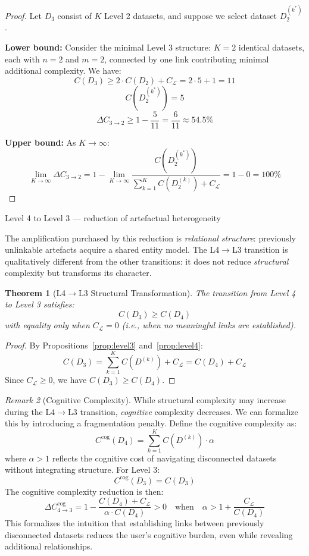 \documentclass[]{hdsr}
\makeatletter
\def\subsubsection{\@startsection{subsubsection}{3}%
  \z@{.5\linespacing\@plus.7\linespacing}{.5\linespacing}%
  {\normalfont\bfseries}}
\theoremstyle{plain}      %
\newtheorem{theorem}{Theorem}[section]
\theoremstyle{definition} %
\theoremstyle{remark}     %
\newtheorem{remark}[theorem]{Remark}
\makeatother
\begin{document}
\begin{proof}
Let $D_3$ consist of $K$ Level 2 datasets, and suppose we select dataset $D_2^{(k^*)}$.

\noindent \textbf{Lower bound:} Consider the minimal Level 3 structure: $K = 2$ identical datasets, each with $n = 2$ and $m = 2$, connected by one link contributing minimal additional complexity. We have:
\[
C(D_3) \geq 2 \cdot C(D_2) + C_{\mathcal{L}} = 2 \cdot 5 + 1 = 11
\]
\[
C(D_2^{(k^*)}) = 5
\]
\[
\Delta C_{3 \to 2} \geq 1 - \frac{5}{11} = \frac{6}{11} \approx 54.5\%
\]

\noindent \textbf{Upper bound:} As $K \to \infty$:
\[
\lim_{K \to \infty} \Delta C_{3 \to 2} = 1 - \lim_{K \to \infty} \frac{C(D_2^{(k^*)})}{\sum_{k=1}^K C(D_2^{(k)}) + C_{\mathcal{L}}} = 1 - 0 = 100\%
\]
\end{proof}

\subsubsection{Level 4 to Level 3 --- reduction of artefactual heterogeneity}

The amplification purchased by this reduction is \emph{relational structure}: previously unlinkable artefacts acquire a shared entity model. The L4$\to$L3 transition is qualitatively different from the other transitions: it does not reduce \emph{structural} complexity but transforms its character.

\begin{theorem}[L4$\to$L3 Structural Transformation]
\label{thm:l4l3}
The transition from Level 4 to Level 3 satisfies:
\[
C(D_3) \geq C(D_4)
\]
with equality only when $C_{\mathcal{L}} = 0$ (i.e., when no meaningful links are established).
\end{theorem}

\begin{proof}
By Propositions~\ref{prop:level3} and~\ref{prop:level4}:
\[
C(D_3) = \sum_{k=1}^{K} C(D^{(k)}) + C_{\mathcal{L}} = C(D_4) + C_{\mathcal{L}}
\]
Since $C_{\mathcal{L}} \geq 0$, we have $C(D_3) \geq C(D_4)$.
\end{proof}

\begin{remark}[Cognitive Complexity]
While structural complexity may increase during the L4$\to$L3 transition, \emph{cognitive} complexity decreases. We can formalize this by introducing a fragmentation penalty. Define the cognitive complexity as:
\[
C^{\text{cog}}(D_4) = \sum_{k=1}^{K} C(D^{(k)}) \cdot \alpha
\]
where $\alpha > 1$ reflects the cognitive cost of navigating disconnected datasets without integrating structure. For Level 3:
\[
C^{\text{cog}}(D_3) = C(D_3)
\]
The cognitive complexity reduction is then:
\[
\Delta C^{\text{cog}}_{4 \to 3} = 1 - \frac{C(D_4) + C_{\mathcal{L}}}{\alpha \cdot C(D_4)} > 0 \quad \text{when} \quad \alpha > 1 + \frac{C_{\mathcal{L}}}{C(D_4)}
\]
This formalizes the intuition that establishing links between previously disconnected datasets reduces the user's cognitive burden, even while revealing additional relationships.
\end{remark}
\end{document}
